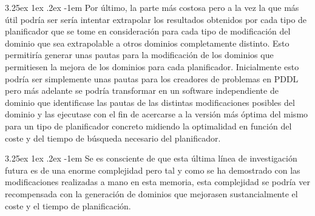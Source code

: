 \documentclass{article}
\makeatletter
\renewcommand\paragraph{\@startsection{paragraph}{5}{\z@}%
  {3.25ex \@plus1ex \@minus.2ex}%
  {-1em}%
  {\normalfont\normalsize\bfseries}}
\makeatother
\begin{document}
\paragraph{}
Por último, la parte más costosa pero a la vez la que más útil podría ser sería intentar extrapolar los resultados obtenidos por cada tipo de planificador que se tome en consideración para cada tipo de modificación del dominio que sea extrapolable a otros dominios completamente distinto. Esto permitiría generar unas pautas para la modificación de los dominios que permitiesen la mejora de los dominios para cada planificador. Inicialmente esto podría ser simplemente unas pautas para los creadores de problemas en PDDL pero más adelante se podría transformar en un software independiente de dominio que identificase las pautas de las distintas modificaciones posibles del dominio y las ejecutase con el fin de acercarse a la versión más óptima del mismo para un tipo de planificador concreto midiendo la optimalidad en función del coste y del tiempo de búsqueda necesario del planificador.

\paragraph{}
Se es consciente de que esta última línea de investigación futura es de una enorme complejidad pero tal y como se ha demostrado con las modificaciones realizadas a mano en esta memoria, esta complejidad se podría ver recompensada con la generación de dominios que mejorasen sustancialmente el coste y el tiempo de planificación.
\end{document}
